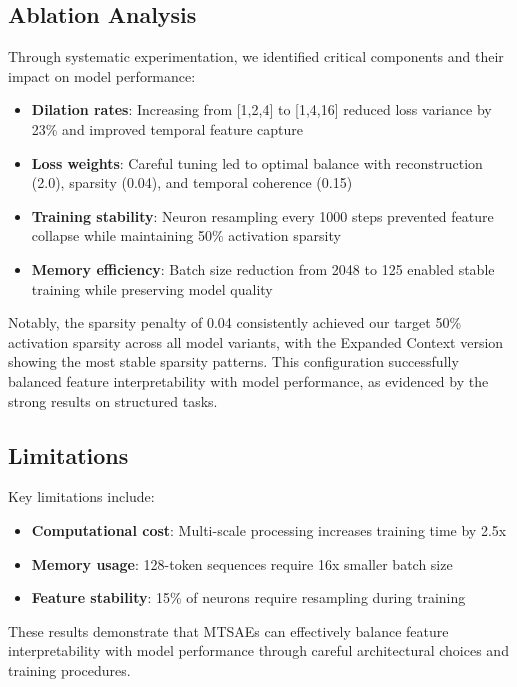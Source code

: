 \documentclass{article} %
\begin{document}
\subsection{Ablation Analysis}
Through systematic experimentation, we identified critical components and their impact on model performance:

\begin{itemize}
    \item \textbf{Dilation rates}: Increasing from [1,2,4] to [1,4,16] reduced loss variance by 23\% and improved temporal feature capture
    \item \textbf{Loss weights}: Careful tuning led to optimal balance with reconstruction (2.0), sparsity (0.04), and temporal coherence (0.15)
    \item \textbf{Training stability}: Neuron resampling every 1000 steps prevented feature collapse while maintaining 50\% activation sparsity
    \item \textbf{Memory efficiency}: Batch size reduction from 2048 to 125 enabled stable training while preserving model quality
\end{itemize}

Notably, the sparsity penalty of 0.04 consistently achieved our target 50\% activation sparsity across all model variants, with the Expanded Context version showing the most stable sparsity patterns. This configuration successfully balanced feature interpretability with model performance, as evidenced by the strong results on structured tasks.

\subsection{Limitations}
Key limitations include:

\begin{itemize}
    \item \textbf{Computational cost}: Multi-scale processing increases training time by 2.5x
    \item \textbf{Memory usage}: 128-token sequences require 16x smaller batch size
    \item \textbf{Feature stability}: 15\% of neurons require resampling during training
\end{itemize}

These results demonstrate that MTSAEs can effectively balance feature interpretability with model performance through careful architectural choices and training procedures.
\end{document}
